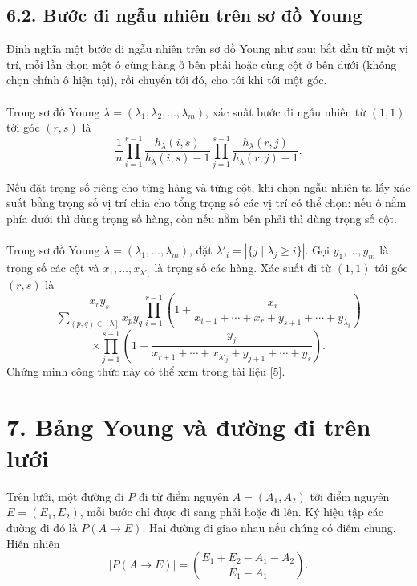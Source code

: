 \documentclass[11pt]{article}
\begin{document}
\subsection*{6.2. Bước đi ngẫu nhiên trên sơ đồ Young}

Định nghĩa một bước đi ngẫu nhiên trên sơ đồ Young như sau: bắt đầu từ một vị
trí, mỗi lần chọn một ô cùng hàng ở bên phải hoặc cùng cột ở bên dưới (không
chọn chính ô hiện tại), rồi chuyển tới đó, cho tới khi tới một góc.

\paragraph{}
Trong sơ đồ Young \(\lambda=(\lambda_1,\lambda_2,\ldots,\lambda_m)\), xác
suất bước đi ngẫu nhiên từ \((1,1)\) tới góc \((r,s)\) là
\[
\frac1n
\prod_{i=1}^{r-1}\frac{h_\lambda(i,s)}{h_\lambda(i,s)-1}
\prod_{j=1}^{s-1}\frac{h_\lambda(r,j)}{h_\lambda(r,j)-1}.
\]

Nếu đặt trọng số riêng cho từng hàng và từng cột, khi chọn ngẫu nhiên ta lấy
xác suất bằng trọng số vị trí chia cho tổng trọng số các vị trí có thể chọn:
nếu ô nằm phía dưới thì dùng trọng số hàng, còn nếu nằm bên phải thì dùng
trọng số cột.

\paragraph{}
Trong sơ đồ Young \(\lambda=(\lambda_1,\ldots,\lambda_m)\), đặt
\(\lambda'_i=|\{j\mid \lambda_j\ge i\}|\). Gọi \(y_1,\ldots,y_m\) là trọng số
các cột và \(x_1,\ldots,x_{\lambda'_1}\) là trọng số các hàng. Xác suất đi từ
\((1,1)\) tới góc \((r,s)\) là
\[
\frac{x_ry_s}{\sum_{(p,q)\in[\lambda]}x_py_q}
\prod_{i=1}^{r-1}\left(
1+\frac{x_i}{x_{i+1}+\cdots+x_r+y_{s+1}+\cdots+y_{\lambda_i}}
\right)
\]
\[
\times
\prod_{j=1}^{s-1}\left(
1+\frac{y_j}{x_{r+1}+\cdots+x_{\lambda'_j}+y_{j+1}+\cdots+y_s}
\right).
\]
Chứng minh công thức này có thể xem trong tài liệu [5].

\section*{7. Bảng Young và đường đi trên lưới}

Trên lưới, một đường đi \(P\) đi từ điểm nguyên \(A=(A_1,A_2)\) tới điểm
nguyên \(E=(E_1,E_2)\), mỗi bước chỉ được đi sang phải hoặc đi lên. Ký hiệu
tập các đường đi đó là \(P(A\to E)\). Hai đường đi giao nhau nếu chúng có điểm
chung. Hiển nhiên
\[
|P(A\to E)|=
\binom{E_1+E_2-A_1-A_2}{E_1-A_1}.
\]
\end{document}
